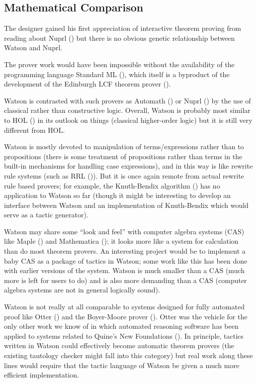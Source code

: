 \documentclass{kluwer}
\begin{document}
\begin{article}
\subsection{Mathematical Comparison}

The designer gained his first appreciation of interactive theorem proving
from reading about Nuprl (\cite{nuprl}) but there is no obvious genetic
relationship between Watson and Nuprl. 

The prover work would have been impossible without the availability of
the programming language Standard ML (\cite{ml}), which itself is a
byproduct of the development of the Edinburgh LCF theorem prover
(\cite{lcf}).

Watson is contrasted with such provers as Automath (\cite{automath})
or Nuprl (\cite{nuprl}) by the use of classical rather than
constructive logic. Overall, Watson is probably most similar to HOL
(\cite{Gordon87,Camilleri87,hol}) in its outlook on things (classical higher-order logic)
but it is still very different from HOL.

Watson is mostly devoted to manipulation of terms/expressions rather
than to propositions (there is some treatment of propositions rather
than terms in the built-in mechanisms for handling case expressions),
and in this way is like rewrite rule systems (such as RRL
(\cite{rrl})). But it is once again remote from actual rewrite rule
based provers; for example, the Knuth-Bendix algorithm
(\cite{knuth-bendix}) has no application to Watson so far (though it
might be interesting to develop an interface between Watson and an
implementation of Knuth-Bendix which would serve as a tactic
generator).

Watson may share some ``look and feel'' with computer algebra systems
(CAS) like Maple (\cite{maple}) and Mathematica (\cite{mathematica}); it
looks more like a system for calculation than do most theorem provers.
An interesting project would be to implement a baby CAS as a package
of tactics in Watson; some work like this has been done with earlier
versions of the system. Watson is much smaller than a CAS (much more
is left for users to do) and is also more demanding than a CAS
(computer algebra systems are not in general logically sound).

Watson is not really at all comparable to systems designed for fully
automated proof like Otter (\cite{otter}) and the Boyer-Moore prover
(\cite{boyer-moore}). Otter was the vehicle for the only other work
we know of in which automated reasoning software has been applied to
systems related to Quine's New Foundations (\cite{jech}). In
principle, tactics written in Watson could effectively become
automatic theorem provers (the existing tautology checker might fall
into this category) but real work along these lines would require that
the tactic language of Watson be given a much more efficient
implementation.


\end{article}
\end{document}
